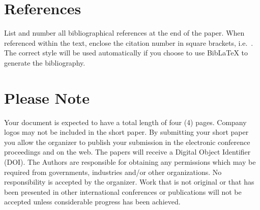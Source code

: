 \documentclass{ama}
\begin{document}
\section{References}
List and number all bibliographical references at the end of the paper.
When referenced within the text, enclose the citation number in square brackets, i.e.~\cite{mouse2011}.
The correct style will be used automatically if you choose to use Bib\LaTeX{} to generate the bibliography.

\printbibliography{}

\section{Please Note}
Your document is expected to have a total length of four (4) pages.
Company logos may not be included in the short paper.
By submitting your short paper you allow the organizer to publish your submission in the electronic conference proceedings and on the web.
The papers will receive a Digital Object Identifier (DOI).
The Authors are responsible for obtaining any permissions which may be required from governments, industries and/or other organizations.
No responsibility is accepted by the organizer.
Work that is not original or that has been presented in other international conferences or publications will not be accepted unless considerable progress has been achieved.
\end{document}
